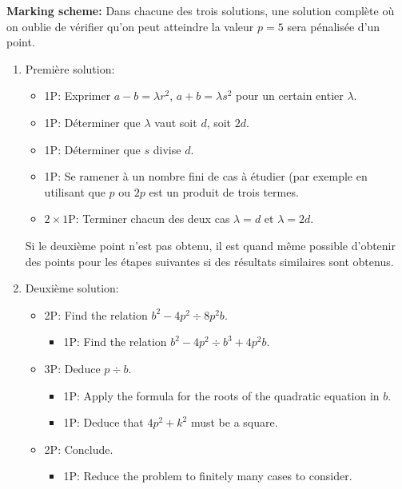\newpage
\textbf{Marking scheme:}
Dans chacune des trois solutions, une solution complète où on oublie de vérifier qu'on peut atteindre la valeur $p=5$ sera pénalisée d'un point.
\begin{enumerate}
    \item Première solution:
\begin{itemize}
    \item 1P: Exprimer $a-b = \lambda r^2$, $a+b = \lambda s^2$ pour un certain entier $\lambda$.
    \item 1P: Déterminer que $\lambda$ vaut soit $d$, soit $2d$.
    \item 1P: Déterminer que $s$ divise $d$.
    \item 1P: Se ramener à un nombre fini de cas à étudier (par exemple en utilisant que $p$ ou $2p$ est un produit de trois termes.
    \item $2\times 1$P: Terminer chacun des deux cas $\lambda = d$ et $\lambda = 2d$.
\end{itemize}
Si le deuxième point n'est pas obtenu, il est quand même possible d'obtenir des points pour les étapes suivantes si des résultats similaires sont obtenus.

    \item Deuxième solution:
\begin{itemize}
    \item 2P: Find the relation $b^2-4p^2 \div 8p^2b$.
    \begin{itemize}
        \item 1P: Find the relation $b^2-4p^2 \div b^3 + 4p^2b$.
    \end{itemize}
    \item 3P: Deduce $p\div b$.
    \begin{itemize}
        \item 1P: Apply the formula for the roots of the quadratic equation in $b$.
        \item 1P: Deduce that $4p^2 + k^2$ must be a square.
    \end{itemize}
    \item 2P: Conclude.
    \begin{itemize}
        \item 1P: Reduce the problem to finitely many cases to consider.
    \end{itemize}
\end{itemize}

\end{enumerate}
